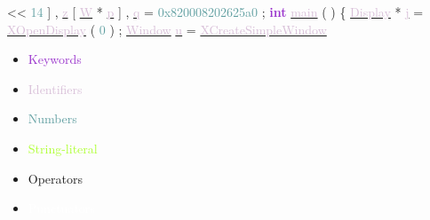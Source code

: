 \documentclass[usenames,dvipsnames]{beamer}
\begin{document}
\begin{frame}
\textcolor{JungleGreen}{\textless\textless} 
\textcolor{CadetBlue}{14} 
] 
, 
\underline{\textcolor{Thistle}{z}} 
[ 
\underline{\textcolor{Thistle}{W}} 
\textcolor{JungleGreen}{*} 
\underline{\textcolor{Thistle}{p}} 
] 
, 
\underline{\textcolor{Thistle}{q}} 
\textcolor{black}{ } \newline 
\textcolor{black}{ } \newline 
\textcolor{JungleGreen}{=} 
\textcolor{CadetBlue}{0x820008202625a0} 
; 
\textbf{\textcolor{DarkOrchid}{int}} 
\underline{\textcolor{Thistle}{main}} 
( 
) 
\{ 
\underline{\textcolor{Thistle}{Display}} 
\textcolor{JungleGreen}{*} 
\underline{\textcolor{Thistle}{j}} 
\textcolor{JungleGreen}{=} 
\underline{\textcolor{Thistle}{XOpenDisplay}} 
( 
\textcolor{CadetBlue}{0} 
) 
; 
\underline{\textcolor{Thistle}{Window}} 
\underline{\textcolor{Thistle}{u}} 
\textcolor{JungleGreen}{=} 
\underline{\textcolor{Thistle}{XCreateSimpleWindow}} 
\textcolor{black}{ } \newline 
\begin{multicols}{3} 
	 \begin{itemize} 
	 	 \item \textcolor{DarkOrchid}{Keywords} 
	 	 \item \textcolor{Thistle}{Identifiers} 
	 	 \item \textcolor{CadetBlue}{Numbers} 
	 	 \item \textcolor{GreenYellow}{String-literal} 
	 	 \item \textcolor{JungleGreen}{Operators} 
	 	 \item \textcolor{white}{Punctuators} 
	 \end{itemize} 
\end{multicols} 
\end{frame} 
 
\end{document}
